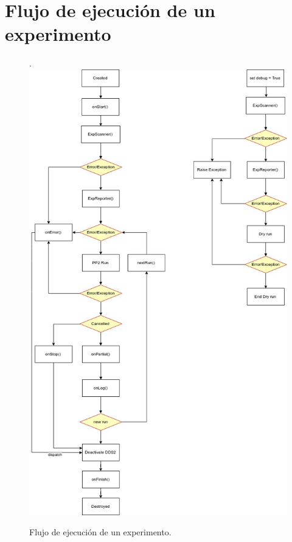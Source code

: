\section{Flujo de ejecuci\'on de un experimento}
\begin{figure}[!htb].
    \includegraphics[scale=0.37]{../figures/d15a.jpg}
    \caption{Flujo de ejecuci\'on de un experimento.}
    \label{fig:d15a}
\end{figure}
\newpage